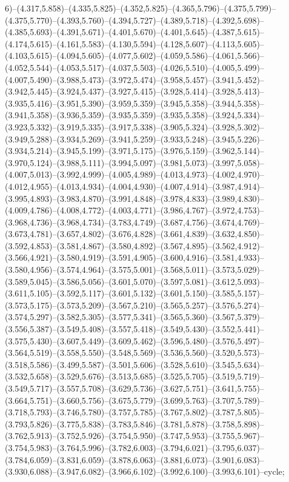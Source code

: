 6)--(4.317,5.858)--(4.335,5.825)--(4.352,5.825)--(4.365,5.796)--(4.375,5.799)--(4.375,5.770)--(4.393,5.760)--(4.394,5.727)--(4.389,5.718)--(4.392,5.698)--(4.385,5.693)--(4.391,5.671)--(4.401,5.670)--(4.401,5.645)--(4.387,5.615)--(4.174,5.615)--(4.161,5.583)--(4.130,5.594)--(4.128,5.607)--(4.113,5.605)--(4.103,5.615)--(4.094,5.605)--(4.077,5.602)--(4.059,5.586)--(4.061,5.566)--(4.052,5.544)--(4.053,5.517)--(4.037,5.503)--(4.026,5.510)--(4.005,5.499)--(4.007,5.490)--(3.988,5.473)--(3.972,5.474)--(3.958,5.457)--(3.941,5.452)--(3.942,5.445)--(3.924,5.437)--(3.927,5.415)--(3.928,5.414)--(3.928,5.413)--(3.935,5.416)--(3.951,5.390)--(3.959,5.359)--(3.945,5.358)--(3.944,5.358)--(3.941,5.358)--(3.936,5.359)--(3.935,5.359)--(3.935,5.358)--(3.924,5.334)--(3.923,5.332)--(3.919,5.335)--(3.917,5.338)--(3.905,5.324)--(3.928,5.302)--(3.949,5.288)--(3.934,5.269)--(3.941,5.259)--(3.933,5.248)--(3.945,5.226)--(3.934,5.214)--(3.945,5.199)--(3.971,5.175)--(3.976,5.159)--(3.962,5.144)--(3.970,5.124)--(3.988,5.111)--(3.994,5.097)--(3.981,5.073)--(3.997,5.058)--(4.007,5.013)--(3.992,4.999)--(4.005,4.989)--(4.013,4.973)--(4.002,4.970)--(4.012,4.955)--(4.013,4.934)--(4.004,4.930)--(4.007,4.914)--(3.987,4.914)--(3.995,4.893)--(3.983,4.870)--(3.991,4.848)--(3.978,4.833)--(3.989,4.830)--(4.009,4.786)--(4.008,4.772)--(4.003,4.771)--(3.986,4.767)--(3.972,4.753)--(3.968,4.736)--(3.968,4.734)--(3.783,4.749)--(3.687,4.756)--(3.674,4.769)--(3.673,4.781)--(3.657,4.802)--(3.676,4.828)--(3.661,4.839)--(3.632,4.850)--(3.592,4.853)--(3.581,4.867)--(3.580,4.892)--(3.567,4.895)--(3.562,4.912)--(3.566,4.921)--(3.580,4.919)--(3.591,4.905)--(3.600,4.916)--(3.581,4.933)--(3.580,4.956)--(3.574,4.964)--(3.575,5.001)--(3.568,5.011)--(3.573,5.029)--(3.589,5.045)--(3.586,5.056)--(3.601,5.070)--(3.597,5.081)--(3.612,5.093)--(3.611,5.105)--(3.592,5.117)--(3.601,5.132)--(3.601,5.150)--(3.585,5.157)--(3.573,5.175)--(3.573,5.209)--(3.567,5.210)--(3.565,5.257)--(3.576,5.274)--(3.574,5.297)--(3.582,5.305)--(3.577,5.341)--(3.565,5.360)--(3.567,5.379)--(3.556,5.387)--(3.549,5.408)--(3.557,5.418)--(3.549,5.430)--(3.552,5.441)--(3.575,5.430)--(3.607,5.449)--(3.609,5.462)--(3.596,5.480)--(3.576,5.497)--(3.564,5.519)--(3.558,5.550)--(3.548,5.569)--(3.536,5.560)--(3.520,5.573)--(3.518,5.586)--(3.499,5.587)--(3.501,5.606)--(3.528,5.610)--(3.545,5.634)--(3.532,5.658)--(3.529,5.676)--(3.513,5.685)--(3.525,5.705)--(3.519,5.719)--(3.549,5.717)--(3.557,5.708)--(3.629,5.736)--(3.627,5.751)--(3.641,5.755)--(3.664,5.751)--(3.660,5.756)--(3.675,5.779)--(3.699,5.763)--(3.707,5.789)--(3.718,5.793)--(3.746,5.780)--(3.757,5.785)--(3.767,5.802)--(3.787,5.805)--(3.793,5.826)--(3.775,5.838)--(3.783,5.846)--(3.781,5.878)--(3.758,5.898)--(3.762,5.913)--(3.752,5.926)--(3.754,5.950)--(3.747,5.953)--(3.755,5.967)--(3.754,5.983)--(3.764,5.996)--(3.782,6.003)--(3.794,6.021)--(3.795,6.037)--(3.784,6.059)--(3.831,6.059)--(3.878,6.063)--(3.881,6.073)--(3.901,6.083)--(3.930,6.088)--(3.947,6.082)--(3.966,6.102)--(3.992,6.100)--(3.993,6.101)--cycle;
